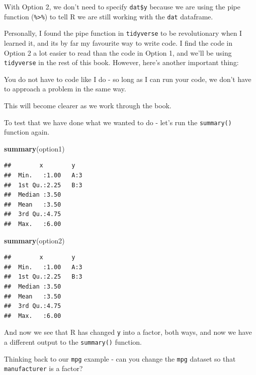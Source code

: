 \documentclass[
]{book}
\newenvironment{Shaded}{\begin{snugshade}}{\end{snugshade}}
\newcommand{\KeywordTok}[1]{\textcolor[rgb]{0.13,0.29,0.53}{\textbf{#1}}}
\newcommand{\NormalTok}[1]{#1}
\begin{document}
With Option 2, we don't need to specify \texttt{dat\$y} because we are using the pipe function (\texttt{\%\textgreater{}\%}) to tell R we are still working with the \texttt{dat} dataframe.

Personally, I found the pipe function in \texttt{tidyverse} to be revolutionary when I learned it, and its by far my favourite way to write code. I find the code in Option 2 a lot easier to read than the code in Option 1, and we'll be using \texttt{tidyverse} in the rest of this book. However, here's another important thing:

\begin{hey}
You do not have to code like I do - so long as I can run your code, we
don't have to approach a problem in the same way.
\end{hey}

This will become clearer as we work through the book.

To test that we have done what we wanted to do - let's run the \texttt{summary()} function again.

\begin{Shaded}
\begin{Highlighting}[]
\KeywordTok{summary}\NormalTok{(option1)}
\end{Highlighting}
\end{Shaded}

\begin{verbatim}
##        x        y    
##  Min.   :1.00   A:3  
##  1st Qu.:2.25   B:3  
##  Median :3.50        
##  Mean   :3.50        
##  3rd Qu.:4.75        
##  Max.   :6.00
\end{verbatim}

\begin{Shaded}
\begin{Highlighting}[]
\KeywordTok{summary}\NormalTok{(option2)}
\end{Highlighting}
\end{Shaded}

\begin{verbatim}
##        x        y    
##  Min.   :1.00   A:3  
##  1st Qu.:2.25   B:3  
##  Median :3.50        
##  Mean   :3.50        
##  3rd Qu.:4.75        
##  Max.   :6.00
\end{verbatim}

And now we see that R has changed \texttt{y} into a factor, both ways, and now we have a different output to the \texttt{summary()} function.

Thinking back to our \texttt{mpg} example - can you change the \texttt{mpg} dataset so that \texttt{manufacturer} is a factor?
\end{document}
